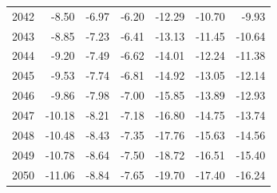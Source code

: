\begin{table}
\begin{tabular}{lrrrrrr}
2042 & -8.50 & -6.97 & -6.20 & -12.29 & -10.70 & -9.93 \\
2043 & -8.85 & -7.23 & -6.41 & -13.13 & -11.45 & -10.64 \\
2044 & -9.20 & -7.49 & -6.62 & -14.01 & -12.24 & -11.38 \\
2045 & -9.53 & -7.74 & -6.81 & -14.92 & -13.05 & -12.14 \\
2046 & -9.86 & -7.98 & -7.00 & -15.85 & -13.89 & -12.93 \\
2047 & -10.18 & -8.21 & -7.18 & -16.80 & -14.75 & -13.74 \\
2048 & -10.48 & -8.43 & -7.35 & -17.76 & -15.63 & -14.56 \\
2049 & -10.78 & -8.64 & -7.50 & -18.72 & -16.51 & -15.40 \\
2050 & -11.06 & -8.84 & -7.65 & -19.70 & -17.40 & -16.24 \\
\bottomrule
\end{tabular}
\end{table}
